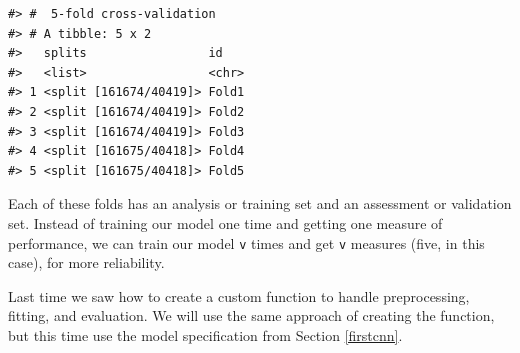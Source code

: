 \documentclass[
]{krantz}
\begin{document}
\begin{verbatim}
#> #  5-fold cross-validation 
#> # A tibble: 5 x 2
#>   splits                 id   
#>   <list>                 <chr>
#> 1 <split [161674/40419]> Fold1
#> 2 <split [161674/40419]> Fold2
#> 3 <split [161674/40419]> Fold3
#> 4 <split [161675/40418]> Fold4
#> 5 <split [161675/40418]> Fold5
\end{verbatim}

Each of these folds has an analysis or training set and an assessment or validation set. Instead of training our model one time and getting one measure of performance, we can train our model \texttt{v} times and get \texttt{v} measures (five, in this case), for more reliability.

Last time we saw how to create a custom function to handle preprocessing, fitting, and evaluation. We will use the same approach of creating the function, but this time use the model specification from Section \ref{firstcnn}.
\end{document}
